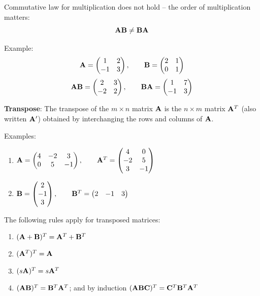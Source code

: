 \documentclass[]{book}
\theoremstyle{definition}
\theoremstyle{definition}
\theoremstyle{definition}
\theoremstyle{remark}
\begin{document}
Commutative law for multiplication does not hold -- the order of
multiplication matters: \[\bf AB\ne BA\]

Example:
\[{\bf A}=\begin{pmatrix} 1&2\\-1&3\end{pmatrix}, \qquad {\bf B}=\begin{pmatrix} 2&1\\0&1\end{pmatrix}\]
\[{\bf AB}=\begin{pmatrix} 2&3\\-2&2\end{pmatrix}, \qquad {\bf BA}=\begin{pmatrix} 1&7\\-1&3\end{pmatrix}\]

\textbf{Transpose}: The transpose of the \(m\times n\) matrix \(\bf A\)
is the \(n\times m\) matrix \({\bf A}^T\) (also written \({\bf A}'\))
obtained by interchanging the rows and columns of \(\bf A\).

Examples:

\begin{enumerate}
        \item ${\bf A}=\begin{pmatrix} 4&-2&3\\0&5&-1\end{pmatrix}, \qquad {\bf A}^T=\begin{pmatrix} 4&0\\-2&5\\3&-1 \end{pmatrix}$
        \item ${\bf B}=\begin{pmatrix} 2\\-1\\3 \end{pmatrix}, \qquad {\bf B}^T=\begin{pmatrix} 2&-1&3\end{pmatrix}$
    \end{enumerate}

The following rules apply for transposed matrices:

\begin{enumerate}
        \item $({\bf A+B})^T = {\bf A}^T+{\bf B}^T$
        \item $({\bf A}^T)^T={\bf A}$
        \item $(s{\bf A})^T = s{\bf A}^T$
        \item $({\bf AB})^T = {\bf B}^T{\bf A}^T$; and by induction $({\bf ABC})^T = {\bf C}^T{\bf B}^T{\bf A}^T$
\end{enumerate}
\end{document}

